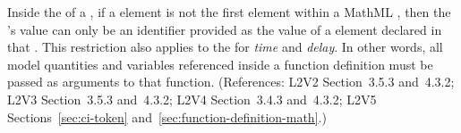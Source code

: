 Inside the  of a \FunctionDefinition, if a  element
is not the first element within a MathML , then the
's value can only be an identifier provided as the
value of a  element declared in that .
This restriction also applies to the  for \emph{time} and \emph{delay}.
In other words, all model quantities and variables referenced
inside a function definition must be passed as arguments to that function.
(References: L2V2 Section~3.5.3 and~4.3.2; L2V3 Section~3.5.3 and~4.3.2; L2V4 Section~3.4.3 and~4.3.2;
L2V5 Sections~\ref{sec:ci-token} and~\ref{sec:function-definition-math}.)
